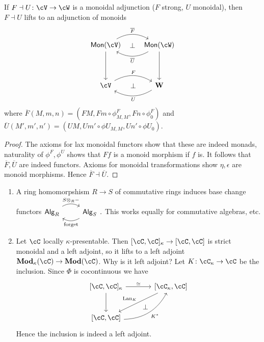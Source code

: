 \documentclass[a4paper,11pt,oneside,openany]{scrbook}
\begin{document}
\begin{prop}
	If $ F \dashv U \from\cV\to \cW $ is a monoidal adjunction ($ F $ strong, $ U $ monoidal), then $ F\dashv U $ lifts to an adjunction of monoids
	\begin{displaymath}
		\begin{tikzcd}[row sep = 4em]
			\Mon(\cV)\arrow[d] \arrow[r,bend left, "\overline F"]\arrow[r,phantom, "\bot"] & \Mon(\cW) \arrow[l, bend left, "\overline U"] \arrow[d]\\
			\cV\arrow[r,bend left, "F"] \arrow[r,phantom, "\bot"]& \catname W \arrow[l, bend left, "U"]
		\end{tikzcd}
	\end{displaymath}
	where $ \overline F(M,m,n) = (FM, Fm \circ \phi_{M,M}^F, Fn \circ \phi_0^F) $
	and $ \overline U(M',m',n') = (UM, Um'\circ \phi U_{M,M}, Un'\circ \phi U_0) $.
\end{prop}
\begin{proof}
	The axioms for lax monoidal functors show that these are indeed monads,
	naturality of $ \phi^F, \phi^U $ shows that $ Ff $ is a monoid morphism if $ f $ is.
	It follows that $ \overline F,\overline U $ are indeed functors.
	Axioms for monoidal transformations show $ \eta, \epsilon $ are monoid morphisms.
	Hence $ \overline F \dashv \overline U $.
\end{proof}
\begin{exmp}
	\begin{enumerate}[label=\roman*)]
		\item A ring homomorpshism $ R \to S $ of commutative rings induces base change functors$\begin{tikzcd}
				      \mathsf{Alg}_R \arrow[r, "S\otimes_R -", bend left] & \mathsf{Alg}_S \arrow[l,"\text{forget}", bend left]
			      \end{tikzcd}.$
		      This works equally for commutative algebras, etc.
		\item Let $ \cC$ locally $ \kappa $-presentable. Then $ [\cC,\cC]_\kappa \to [\cC,\cC] $ is strict monoidal and a     left adjoint, so it lifts to a left adjoint $ \Mod_\kappa (\cC) \to \Mod(\cC) $.
		      Why is it left adjoint? Let $ K\from \cC_\kappa \to \cC$ be the inclusion. Since $ \Phi $ is cocontinuous we have
		      \begin{displaymath}
			      \begin{tikzcd}[row sep = large, column sep = large]
				      \lbrack\cC,\cC\rbrack_\kappa
				      \arrow[r, "\simeq"]\arrow[d] &
				      \lbrack\cC_\kappa,\cC\rbrack \arrow[dl, "\Lan_K"']\arrow[dl, phantom, "\bot", bend left=15]
				      \\
				      \lbrack\cC, \cC\rbrack \arrow[ru, "K^*"', bend right]
			      \end{tikzcd}
		      \end{displaymath}
		      Hence the inclusion is indeed a left adjoint.
	\end{enumerate}
\end{exmp}
\end{document}
